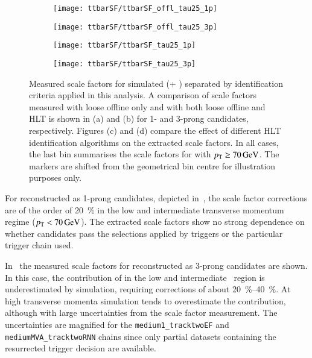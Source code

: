 \begin{figure}[htbp]
  \centering

  \begin{subfigure}[t]{.495\textwidth}
    \texttt{[image: ttbarSF/ttbarSF\_offl\_tau25\_1p]}
    \caption{}
    \label{fig:ttbarSF_postfit_SF_a}
  \end{subfigure}\hfill%
  \begin{subfigure}[t]{.495\textwidth}
    \texttt{[image: ttbarSF/ttbarSF\_offl\_tau25\_3p]}
    \caption{}
    \label{fig:ttbarSF_postfit_SF_b}
  \end{subfigure}

  \begin{subfigure}[t]{.495\textwidth}
    \texttt{[image: ttbarSF/ttbarSF\_tau25\_1p]}
    \caption{}
    \label{fig:ttbarSF_postfit_SF_c}
  \end{subfigure}\hfill%
  \begin{subfigure}[t]{.495\textwidth}
    \texttt{[image: ttbarSF/ttbarSF\_tau25\_3p]}
    \caption{}
    \label{fig:ttbarSF_postfit_SF_d}
  \end{subfigure}

  \caption{Measured \faketauhadvis scale factors for simulated \ttbar
    (\POWHEGBOX[v2] + \PYTHIA[8]) separated by \tauhadvis
    identification criteria applied in this analysis. A comparison of
    \faketauhadvis scale factors measured with loose offline \tauid
    only and with both loose offline and HLT \tauid is shown in (a)
    and (b) for 1- and 3-prong \tauhadvis candidates, respectively.
    Figures (c) and (d) compare the effect of different HLT
    identification algorithms on the extracted scale factors. In all
    cases, the last bin summarises the scale factors for \tauhadvis
    with $\pT \geq \SI{70}{\GeV}$.  The markers are shifted from the
    geometrical bin centre for illustration purposes only.}%
  \label{fig:ttbarSF_postfit_SF}
\end{figure}

For \faketauhadvis reconstructed as 1-prong \tauhadvis candidates,
depicted in~,
the scale factor corrections are of the order of \SI{20}{\percent} in
the low and intermediate transverse momentum regime
($\pT < \SI{70}{\GeV}$). The extracted scale factors show no strong
dependence on whether candidates pass the selections applied by
\tauhadvis triggers or the particular trigger chain used.

In~ the
measured scale factors for \faketauhadvis reconstructed as 3-prong
candidates are shown. In this case, the contribution of \faketauhadvis
in the low and intermediate \tauhadvis~\pT region is underestimated by
simulation, requiring corrections of about
\SIrange{20}{40}{\percent}. At high transverse momenta simulation
tends to overestimate the \faketauhadvis contribution, although with
large uncertainties from the scale factor measurement. The
uncertainties are magnified for the \texttt{medium1\_tracktwoEF} and
\texttt{mediumMVA\_tracktwoRNN} chains since only partial datasets
containing the resurrected trigger decision are available.

